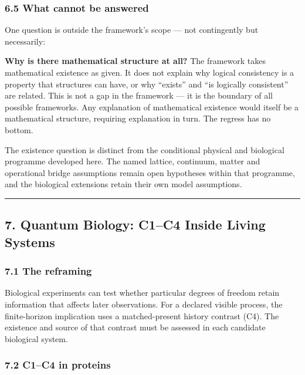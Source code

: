 \documentclass[
]{article}
\begin{document}
\hypertarget{what-cannot-be-answered}{%
\subsubsection{6.5 What cannot be
answered}\label{what-cannot-be-answered}}

One question is outside the framework's scope --- not contingently but
necessarily:

\textbf{Why is there mathematical structure at all?} The framework takes
mathematical existence as given. It does not explain why logical
consistency is a property that structures can have, or why ``exists''
and ``is logically consistent'' are related. This is not a gap in the
framework --- it is the boundary of all possible frameworks. Any
explanation of mathematical existence would itself be a mathematical
structure, requiring explanation in turn. The regress has no bottom.

The existence question is distinct from the conditional physical and
biological programme developed here. The named lattice, continuum,
matter and operational bridge assumptions remain open hypotheses within
that programme, and the biological extensions retain their own model
assumptions.

\begin{center}\rule{0.5\linewidth}{0.5pt}\end{center}

\hypertarget{quantum-biology-c1c4-inside-living-systems}{%
\subsection{7. Quantum Biology: C1--C4 Inside Living
Systems}\label{quantum-biology-c1c4-inside-living-systems}}

\hypertarget{the-reframing}{%
\subsubsection{7.1 The reframing}\label{the-reframing}}

Biological experiments can test whether particular degrees of freedom
retain information that affects later observations. For a declared
visible process, the finite-horizon implication uses a matched-present
history contrast (C4). The existence and source of that contrast must be
assessed in each candidate biological system.

\hypertarget{c1c4-in-proteins}{%
\subsubsection{7.2 C1--C4 in proteins}\label{c1c4-in-proteins}}
\end{document}
